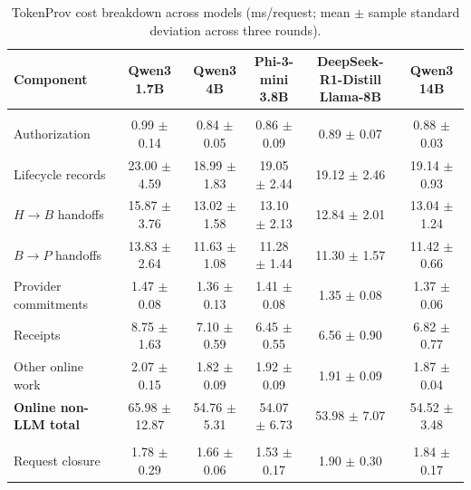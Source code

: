 \begin{table}[!t]
\centering
\caption{TokenProv cost breakdown across models (ms/request; mean $\pm$ sample standard deviation across three rounds).}
\label{tab:b2-component-breakdown}
\footnotesize
\renewcommand{\arraystretch}{1.10}
\begin{tabular*}{\textwidth}{@{\hspace{4pt}}l@{\extracolsep{\fill}}ccccc@{\hspace{4pt}}}
\toprule
\textbf{Component} & \shortstack{\textbf{Qwen3}\\\textbf{1.7B}} & \shortstack{\textbf{Qwen3}\\\textbf{4B}} & \shortstack{\textbf{Phi-3-mini}\\\textbf{3.8B}} & \shortstack{\textbf{DeepSeek-R1-Distill}\\\textbf{Llama-8B}} & \shortstack{\textbf{Qwen3}\\\textbf{14B}} \\
\midrule
\rowcolor{gray!12}
\multicolumn{6}{l}{\textbf{Online non-LLM work}} \\
Authorization & 0.99 $\pm$ 0.14 & 0.84 $\pm$ 0.05 & 0.86 $\pm$ 0.09 & 0.89 $\pm$ 0.07 & 0.88 $\pm$ 0.03 \\
Lifecycle records & 23.00 $\pm$ 4.59 & 18.99 $\pm$ 1.83 & 19.05 $\pm$ 2.44 & 19.12 $\pm$ 2.46 & 19.14 $\pm$ 0.93 \\
$H\!\rightarrow\!B$ handoffs & 15.87 $\pm$ 3.76 & 13.02 $\pm$ 1.58 & 13.10 $\pm$ 2.13 & 12.84 $\pm$ 2.01 & 13.04 $\pm$ 1.24 \\
$B\!\rightarrow\!P$ handoffs & 13.83 $\pm$ 2.64 & 11.63 $\pm$ 1.08 & 11.28 $\pm$ 1.44 & 11.30 $\pm$ 1.57 & 11.42 $\pm$ 0.66 \\
Provider commitments & 1.47 $\pm$ 0.08 & 1.36 $\pm$ 0.13 & 1.41 $\pm$ 0.08 & 1.35 $\pm$ 0.08 & 1.37 $\pm$ 0.06 \\
Receipts & 8.75 $\pm$ 1.63 & 7.10 $\pm$ 0.59 & 6.45 $\pm$ 0.55 & 6.56 $\pm$ 0.90 & 6.82 $\pm$ 0.77 \\
Other online work & 2.07 $\pm$ 0.15 & 1.82 $\pm$ 0.09 & 1.92 $\pm$ 0.09 & 1.91 $\pm$ 0.09 & 1.87 $\pm$ 0.04 \\
\textbf{Online non-LLM total} & 65.98 $\pm$ 12.87 & 54.76 $\pm$ 5.31 & 54.07 $\pm$ 6.73 & 53.98 $\pm$ 7.07 & 54.52 $\pm$ 3.48 \\
\midrule
\rowcolor{gray!12}
\multicolumn{6}{l}{\textbf{Remaining request processing}} \\
Request closure & 1.78 $\pm$ 0.29 & 1.66 $\pm$ 0.06 & 1.53 $\pm$ 0.17 & 1.90 $\pm$ 0.30 & 1.84 $\pm$ 0.17 \\

\end{tabular*}
\end{table}

